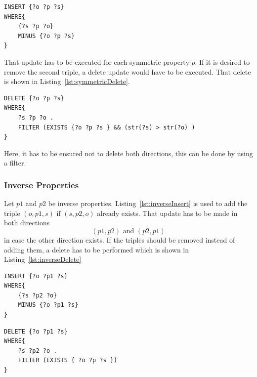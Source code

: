 \begin{lstlisting}[captionpos=b, caption=SPARQL update for adding triples with the symmetric property p., label=lst:symmetricInsert,
basicstyle=\ttfamily,frame=single,float=hbt,]
INSERT {?o ?p ?s}
WHERE{
	{?s ?p ?o}
	MINUS {?o ?p ?s}
}
\end{lstlisting}

That update has to be executed for each symmetric property $p$. If it is desired to remove the second triple, a delete update would have to be executed. That delete is shown in Listing~\ref{lst:symmetricDelete}.


\begin{lstlisting}[captionpos=b, caption=SPARQL update for removing triples with the symmetric property p., label=lst:symmetricDelete,
basicstyle=\ttfamily,frame=single,float=hbt,]
DELETE {?o ?p ?s}
WHERE{
	?s ?p ?o .
	FILTER (EXISTS {?o ?p ?s } && (str(?s) > str(?o) )
}
\end{lstlisting}

Here, it has to be ensured not to delete both directions, this can be done by using a filter.

\subsubsection{Inverse Properties}

Let $ p1 $ and $ p2 $ be inverse properties. Listing~\ref{lst:inverseInsert} is used to add the triple $(o,p1,s)$ if $(s,p2,o)$ already exists. That update has to be made in both directions  
\[
(p1,p2) \text{ and } (p2,p1)
\]
in case the other direction exists. If the triples should be removed instead of adding them, a delete has to be performed which is shown in Listing~\ref{lst:inverseDelete}

\begin{lstlisting}[captionpos=b, caption=SPARQL update for adding triples with the inverse properties p1 and p2., label=lst:inverseInsert,
basicstyle=\ttfamily,frame=single,float=hbt,]
INSERT {?o ?p1 ?s}
WHERE{
	{?s ?p2 ?o}
	MINUS {?o ?p1 ?s}
}
\end{lstlisting}



\begin{lstlisting}[captionpos=b, caption=SPARQL update for removing triples with the inverse properties p1 and p2., label=lst:inverseDelete,
basicstyle=\ttfamily,frame=single,float=hbt,]
DELETE {?o ?p1 ?s}
WHERE{
	?s ?p2 ?o .
	FILTER (EXISTS { ?o ?p ?s })
}
\end{lstlisting}

